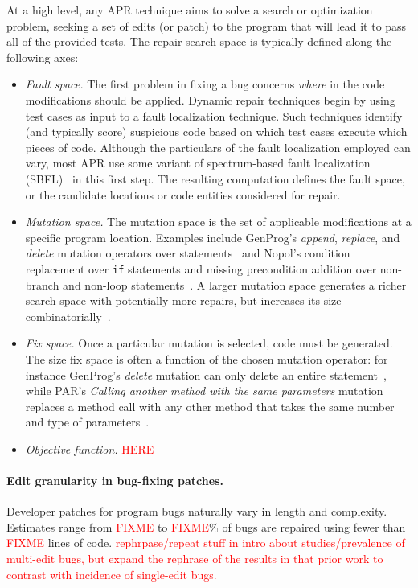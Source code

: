 \documentclass[sigconf, timestamp-false, anonymous=true]{acmart}
\newcommand\todo[1]{\textcolor{red}{#1}}
\begin{document}
At a high level, any APR technique aims to solve a search or optimization
problem, seeking a set of edits (or patch) to the program that will lead it to
pass all of the provided tests. The repair search space is typically defined
along the following axes:
\begin{itemize}
\item \emph{Fault space.} The first problem in fixing a bug concerns
  \emph{where} in the code modifications should be applied. Dynamic repair
  techniques begin by using test cases as input to a fault localization
  technique. Such techniques identify (and typically score) suspicious code
  based on which test cases execute which pieces of code. Although the
  particulars of the fault localization employed can vary, most APR use some
  variant of spectrum-based fault localization (SBFL)~\cite{ochiai} in this first
  step. The resulting computation defines the fault space, or the candidate
  locations or code entities considered for repair.

\item \emph{Mutation space.} The mutation space is the set of applicable
  modifications at a specific program location. Examples include GenProg's
  \emph{append}, \emph{replace}, and \emph{delete} mutation operators over
  statements~\cite{genprog-operators} and Nopol's condition replacement over
  \texttt{if} statements and missing precondition addition over non-branch and
  non-loop statements~\cite{Xuan17}.  A larger mutation space generates a richer
  search space with potentially more repairs, but increases its size
  combinatorially~\cite{long-search-spaces}.

\item \emph{Fix space.} Once a particular mutation is selected, code must be
  generated. The size fix space is often a function of the chosen mutation
  operator: for instance GenProg's \emph{delete} mutation can only delete an
  entire statement~\cite{genprog}, while PAR's \emph{Calling another method with
    the same parameters} mutation replaces a method call with any other method
  that takes the same number and type of parameters~\cite{par}.
\item \emph{Objective function.} \todo{HERE}
\end{itemize}



\paragraph{Edit granularity in bug-fixing patches.}  Developer patches for
program bugs naturally vary in length and complexity.  Estimates range from
\todo{FIXME} to \todo{FIXME}\% of bugs are repaired using fewer than
\todo{FIXME} lines of code.  \todo{rephrpase/repeat stuff in intro about
  studies/prevalence of multi-edit bugs, but expand the rephrase of the results
  in that prior work to contrast with incidence of single-edit bugs.}  
\end{document}
